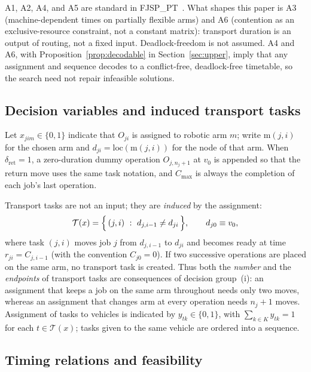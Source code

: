 \documentclass[manuscript,screen,review]{acmart}
\begin{document}
A1, A2, A4, and A5 are standard in FJSP\_PT~\cite{xin2025review}.
What shapes this paper is A3 (machine-dependent times on partially flexible arms) and A6 (contention as an exclusive-resource constraint, not a constant matrix): transport duration is an output of routing, not a fixed input.
Deadlock-freedom is not assumed.
A4 and A6, with Proposition~\ref{prop:decodable} in Section~\ref{sec:upper}, imply that any assignment and sequence decodes to a conflict-free, deadlock-free timetable, so the search need not repair infeasible solutions.

\subsection{Decision variables and induced transport tasks}

Let $x_{jim}\in\{0,1\}$ indicate that $O_{ji}$ is assigned to robotic arm $m$; write $\mathrm{m}(j,i)$ for the chosen arm and $d_{ji}=\mathrm{loc}(\mathrm{m}(j,i))$ for the node of that arm.
When $\delta_{\mathrm{ret}}=1$, a zero-duration dummy operation $O_{j,n_j+1}$ at $v_0$ is appended so that the return move uses the same task notation, and $C_{\max}$ is always the completion of each job's last operation.

Transport tasks are not an input; they are \emph{induced} by the assignment:
\begin{equation}
\label{eq:tasks}
\mathcal{T}(x)=\Bigl\{\,(j,i)\ :\ d_{j,i-1}\neq d_{ji}\,\Bigr\},
\qquad d_{j0}\equiv v_0 ,
\end{equation}
where task $(j,i)$ moves job $j$ from $d_{j,i-1}$ to $d_{ji}$ and becomes ready at time $r_{ji}=C_{j,i-1}$ (with the convention $C_{j0}=0$).
If two successive operations are placed on the same arm, no transport task is created.
Thus both the \emph{number} and the \emph{endpoints} of transport tasks are consequences of decision group~(i): an assignment that keeps a job on the same arm throughout needs only two moves, whereas an assignment that changes arm at every operation needs $n_j+1$ moves.
Assignment of tasks to vehicles is indicated by $y_{tk}\in\{0,1\}$, with $\sum_{k\in K}y_{tk}=1$ for each $t\in\mathcal{T}(x)$; tasks given to the same vehicle are ordered into a sequence.

\subsection{Timing relations and feasibility}
\end{document}

